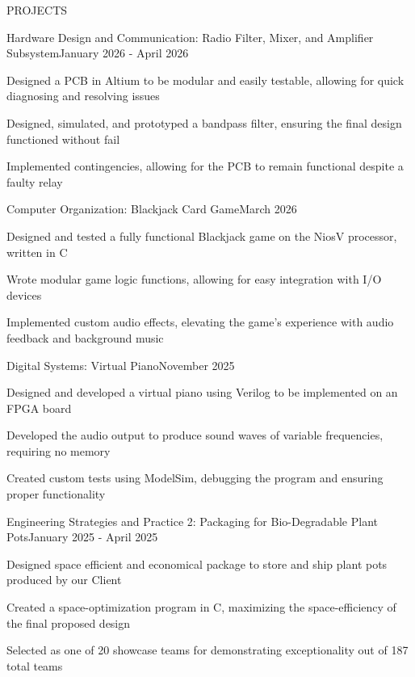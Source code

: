 \documentclass{resume}
\begin{document}
\begin{rSection}{PROJECTS}

\begin{rSubsection}{Hardware Design and Communication: Radio Filter, Mixer, and Amplifier Subsystem}{January 2026 - April 2026}{}{}
\item Designed a PCB in Altium to be modular and easily testable, allowing for quick diagnosing and resolving issues
\item Designed, simulated, and prototyped a bandpass filter, ensuring the final design functioned without fail
\item Implemented contingencies, allowing for the PCB to remain functional despite a faulty relay
\end{rSubsection}


\begin{rSubsection}{Computer Organization: Blackjack Card Game}{March 2026}{}{}
\item Designed and tested a fully functional Blackjack game on the NiosV processor, written in C
\item Wrote modular game logic functions, allowing for easy integration with I/O devices
\item Implemented custom audio effects, elevating the game's experience with audio feedback and background music
\end{rSubsection}


\begin{rSubsection}{Digital Systems: Virtual Piano}{November 2025}{}{}
\item Designed and developed a virtual piano using Verilog to be implemented on an FPGA board
\item Developed the audio output to produce sound waves of variable frequencies, requiring no memory
\item Created custom tests using ModelSim, debugging the program and ensuring proper functionality
\end{rSubsection}


\begin{rSubsection}{Engineering Strategies and Practice 2: Packaging for Bio-Degradable Plant Pots}{January 2025 - April 2025}{}{}
\item Designed space efficient and economical package to store and ship plant pots produced by our Client
\item Created a space-optimization program in C, maximizing the space-efficiency of the final proposed design
\item Selected as one of 20 showcase teams for demonstrating exceptionality out of 187 total teams
\end{rSubsection}


\end{rSection}
\end{document}

